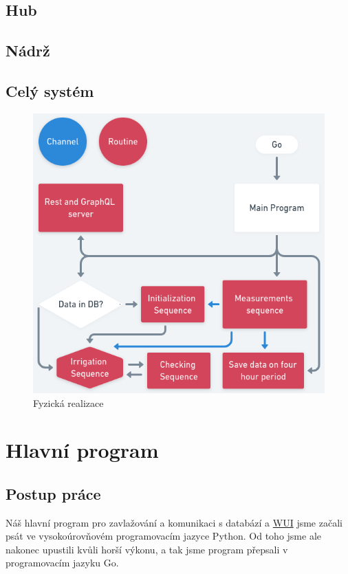 \documentclass[12pt,a4paper]{article}
\begin{document}
\subsection{Hub}

\subsection{Nádrž}

\subsection{Celý systém}


\begin{figure}[h]
	\centering
	\includegraphics[width=0.72\linewidth]{go.png}
	\caption{Fyzická realizace}
\end{figure}

\clearpage

\section{Hlavní program}

\subsection{Postup práce}

Náš hlavní program pro zavlažování a komunikaci s databází a \underline{\ac{WUI}} jsme začali psát ve vysokoúrovňovém programovacím jazyce Python. Od toho jsme ale nakonec upustili kvůli horší výkonu, a tak jsme program přepsali v programovacím jazyku Go.
\end{document}
